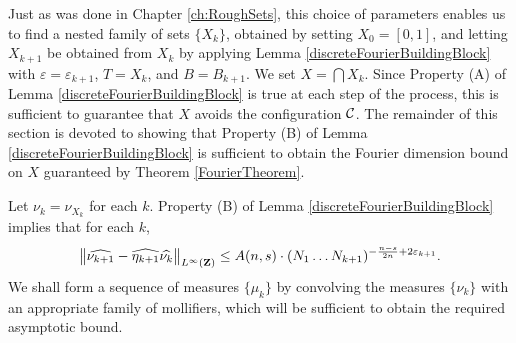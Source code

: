 Just as was done in Chapter \ref{ch:RoughSets}, this choice of parameters enables us to find a nested family of sets $\{ X_k \}$, obtained by setting $X_0 = [0,1]$, and letting $X_{k+1}$ be obtained from $X_k$ by applying Lemma \ref{discreteFourierBuildingBlock} with $\varepsilon = \varepsilon_{k+1}$, $T = X_k$, and $B = B_{k+1}$. We set $X = \bigcap X_k$. Since Property (A) of Lemma \eqref{discreteFourierBuildingBlock} is true at each step of the process, this is sufficient to guarantee that $X$ avoids the configuration $\operatorname{\mathcal{C}}$. The remainder of this section is devoted to showing that Property (B) of Lemma \ref{discreteFourierBuildingBlock} is sufficient to obtain the Fourier dimension bound on $X$ guaranteed by Theorem \ref{FourierTheorem}.

Let $\nu_k = \nu_{X_k}$ for each $k$. Property (B) of Lemma \ref{discreteFourierBuildingBlock} implies that for each $k$,
%
\begin{equation} \label{equation77770123091293120}
    \left\| \widehat{\nu_{k+1}} - \widehat{\eta_{k+1}} \widehat{\nu_k} \right\|_{L^\infty(\operatorname{\mathbf{Z}})} \leq A(n,s) \cdot (N_1 \dots N_{k+1})^{- \frac{n-s}{2n} + 2\varepsilon_{k+1}}.
\end{equation}
%
We shall form a sequence of measures $\{ \mu_k \}$ by convolving the measures $\{ \nu_k \}$ with an appropriate family of mollifiers, which will be sufficient to obtain the required asymptotic bound.


